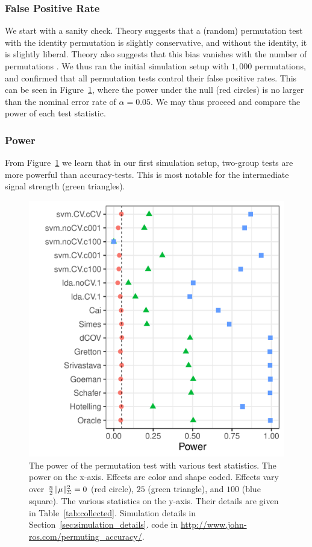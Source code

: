 \documentclass[oupdraft]{bio}
\begin{document}
\subsubsection{False Positive Rate}
\label{sec:type_i}

We start with a sanity check. 
Theory suggests that a (random) permutation test with the identity permutation is slightly conservative, and without the identity, it is slightly liberal.
Theory also suggests that this bias vanishes with the number of permutations \citep{hemerik_exact_2014}.
We thus ran the initial simulation setup with $1,000$ permutations, and confirmed that all permutation tests control their false positive rates. 
This can be seen in Figure~\ref{fig:simulation_1}, where the power under the null (red circles) is no larger than the nominal error rate of $\alpha=0.05$. 
We may thus proceed and compare the power of each test statistic. 



\subsubsection{Power}
\label{sec:power}

From Figure~\ref{fig:simulation_1} we learn that in our first simulation setup, two-group tests are more powerful than accuracy-tests.
This is most notable for the intermediate signal strength (green triangles). 

\begin{figure}[h]
	\centering
	\includegraphics[width=0.5\columnwidth]{"art/file2"}
	\caption{
		The power of the permutation test with various test statistics. 
		The power on the x-axis. 
		Effects are color and shape coded. 
		Effects vary over $\frac{n}{2}\Vert \mu \Vert^2_\Sigma=0$ (red circle), $25$ (green triangle), and $100$ (blue square). 
		The various statistics on the y-axis. 
		Their details are given in Table~\ref{tab:collected}. 
		Simulation details in Section~\ref{sec:simulation_details}.
		\R code in \url{http://www.john-ros.com/permuting_accuracy/}.}	
	\label{fig:simulation_1}
\end{figure}
\end{document}
